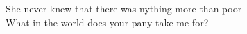 \songwordfb{} She never knew that there was nything more than poor \\
\songwordfb{} What in the world does your pany take me for? \\

